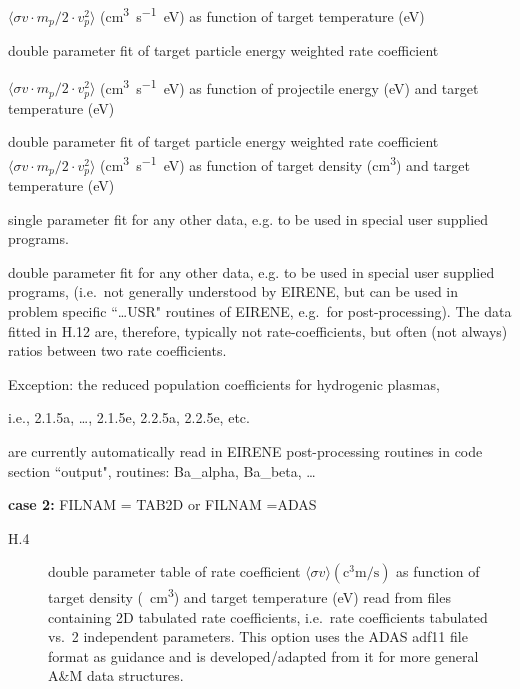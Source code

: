 \begin{description}
\begin{description}
                $\langle \sigma v \cdot m_p / 2 \cdot v_p^2 \rangle$
                (\si{\cubic\centi\metre\per\second\electronvolt}) as function of target
                temperature (\si{\electronvolt})
          \item[H.9] double parameter fit of target
                particle energy weighted rate coefficient

                $\langle \sigma v \cdot m_p / 2 \cdot v_p^2 \rangle$
                (\si{\cubic\centi\metre\per\second\electronvolt}) as function of projectile
                energy (\si{\electronvolt}) and target temperature (\si{\electronvolt})
          \item[H.10] double parameter fit of target particle energy weighted rate
                coefficient $\langle \sigma v \cdot m_p / 2 \cdot v_p^2 \rangle$
                (\si{\cubic\centi\metre\per\second\electronvolt}) as function of target density
                (\si{\cubic\centi\metre}) and target temperature (\si{\electronvolt})
          \item[H.11] single parameter fit for any other data, e.g. to be used in special
                user supplied programs.
          \item[H.12] double parameter fit for any other data, e.g. to be used in special
                user supplied programs, (i.e.\ not generally understood by EIRENE, but can be
                used in problem specific ``\dots USR" routines of EIRENE, e.g.\ for
                post-processing).
                The data fitted in H.12 are, therefore, typically not rate-coefficients, but
                often (not always) ratios between two rate coefficients.

                Exception: the reduced population coefficients for hydrogenic plasmas,

                i.e., 2.1.5a, \dots, 2.1.5e, 2.2.5a, 2.2.5e, etc.\

                are currently automatically read in EIRENE post-processing routines in code
                section ``output", routines: Ba\_alpha, Ba\_beta, \dots
        \end{description}

        \textbf{case 2:} FILNAM = TAB2D  or FILNAM =ADAS
        \begin{description}
          \item[H.4]
                double parameter table of rate coefficient $\langle \sigma v \rangle
                  (\si{\cubic\centi\metre\per\second})$ as function of target density
                (\si{\per\cubic\centi\metre}) and target temperature (\si{\electronvolt}) read
                from files containing 2D tabulated rate coefficients, i.e.\ rate coefficients
                tabulated vs.\ 2 independent parameters.
                This option uses the \ac{ADAS} adf11 file format as guidance and is
                developed\slash adapted from it for more general A\&M data structures.


\end{description}
\end{description}
